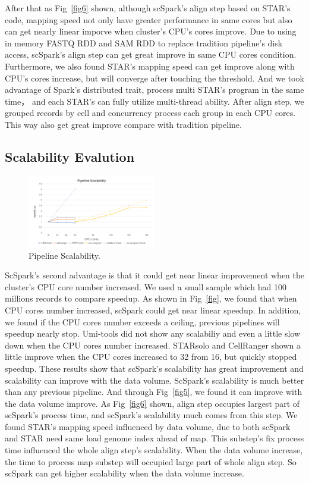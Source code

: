 \documentclass[10pt,journal,compsoc]{IEEEtran}
\begin{document}
After that as Fig~\ref{fig6} shown, although scSpark's align step based on STAR's code, mapping speed not only have greater performance in same cores but also can get nearly linear imporve when cluster's CPU's cores improve.
Due to using in memory FASTQ RDD and SAM RDD to replace tradition pipeline's disk access, scSpark's align step can get great improve in same CPU cores condition.
Furthermore, we also found STAR's mapping speed can get improve along with CPU's cores increase, but will converge after touching the threshold.
And we took advantage of Spark's distributed trait, process multi STAR's program in the same time， and each STAR's can fully utilize multi-thread ability.
After align step, we grouped records by cell and concurrency process each group in each CPU cores.
This way also get great improve compare with tradition pipeline.
\subsection{Scalability Evalution}
\begin{figure}
	\includegraphics[width=0.5\textwidth]{fig4.pdf}
	\caption{Pipeline Scalability.} \label{fig4}
\end{figure}
ScSpark's second advantage is that it could get near linear improvement when the cluster's CPU core number increased. 
We used a small sample which had 100 millions records to compare speedup. 
As shown in Fig~\ref{fig}, we found that when CPU cores number increased, scSpark could get near linear speedup. 
In addition, we found if the CPU cores number exceeds a ceiling, previous pipelines will speedup nearly stop. 
Umi-tools did not show any scalabiliy and even a little slow down when the CPU cores number increased. 
STARsolo and CellRanger shown a little improve when the CPU cores increased to 32 from 16, but quickly stopped speedup. 
These results show that scSpark's scalability has great improvement and scalability can improve with the data volume. 
ScSpark's scalability is much better than any previous pipeline.
And through Fig~\ref{fig5}, we found it can improve with the data volume improve.
As Fig~\ref{fig6} shown, align step occupies largest part of scSpark's process time, and scSpark's scalability much comes from this step.
We found STAR's mapping speed influenced by data volume, due to both scSpark and STAR need same load genome index ahead of map.
This substep's fix process time influenced the whole align step's scalability.
When the data volume increase, the time to process map substep will occupied large part of whole align step.
So scSpark can get higher scalability when the data volume increase.
\end{document}
